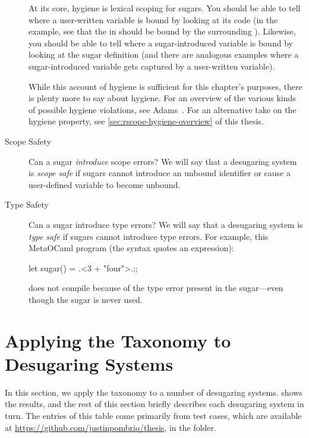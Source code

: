 \begin{description}
    At its core, hygiene is lexical scoping for sugars. You should be
    able to tell where a user-written variable is bound by looking at
    its code (in the example, see that the  in  should be bound by the surrounding ).
    Likewise,
    you should be able to tell where a sugar-introduced variable is
    bound by looking at the sugar definition (and there are analogous
    examples where a sugar-introduced variable gets captured by a
    user-written variable).

    While this account of hygiene is sufficient for this chapter's
    purposes, there is plenty more to say about hygiene. For an
    overview of the various kinds of possible hygiene violations, see
    Adams~\cite{adams-hygiene}. For an alternative take on the hygiene
    property, see \cref{sec:rscope-hygiene-overview} of this thesis.
    
  \item[Scope Safety] Can a sugar \emph{introduce} scope errors?  We
    will say that a desugaring system is \emph{scope safe} if sugars
    cannot introduce an unbound identifier or cause a user-defined
    variable to become unbound.

  \item[Type Safety] Can a sugar introduce type errors? We will say
    that a desugaring system is \emph{type safe} if sugars cannot
    introduce type errors. For example, this MetaOCaml program (the
     syntax quotes an expression):
\begin{CorrectlyIndentedCodes}
let sugar() = .<3 + "four">.;;
\end{CorrectlyIndentedCodes}
    does not compile because of the type error present in the
    sugar---even though the sugar is never used.
\end{description}

\section{Applying the Taxonomy to Desugaring Systems}\label{sec:taxonomy-systems}

In this section, we apply the taxonomy to a number of desugaring
systems.
 shows the results, and the rest
of this section briefly describes each desugaring system in turn. The
entries of this table come primarily from test cases, which are
available at \url{https://github.com/justinpombrio/thesis}, in the
 folder.


